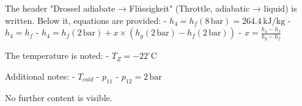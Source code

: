 The header "Drossel adiabate → Flüssigkeit" (Throttle, adiabatic → liquid) is written. Below it, equations are provided:  
- \( h_4 = h_f (8 \, \text{bar}) = 264.4 \, \text{kJ/kg} \)  
- \( h_4 = h_f \)  
- \( h_4 = h_f (2 \, \text{bar}) + x \times (h_g (2 \, \text{bar}) - h_f (2 \, \text{bar})) \)  
- \( x = \frac{h_4 - h_f}{h_g - h_f} \)  

The temperature is noted:  
- \( T_Z = -22^\circ \text{C} \)  

Additional notes:  
- \( T_{cold} \)  
- \( p_{11} \)  
- \( p_{12} = 2 \, \text{bar} \)  

No further content is visible.